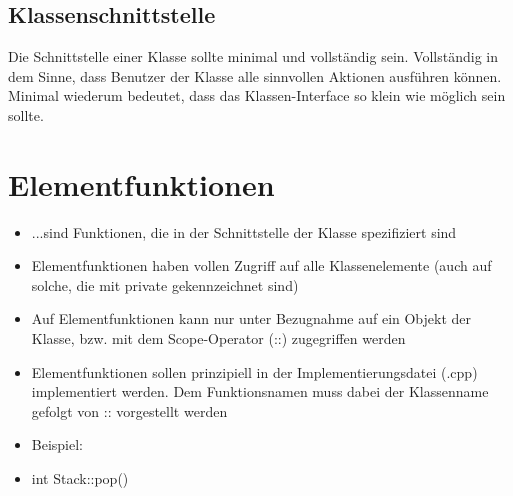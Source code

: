 \subsection{Klassenschnittstelle}
\label{sec:Klassenschnittstelle}
Die Schnittstelle einer Klasse sollte minimal und vollständig sein. Vollständig in dem Sinne, dass Benutzer der Klasse alle sinnvollen Aktionen ausführen können. Minimal wiederum bedeutet, dass das Klassen-Interface so klein wie möglich sein sollte.

\section{Elementfunktionen}
\label{sec:Elementfunktionen}
\begin{itemize}
	\item ...sind Funktionen, die in der Schnittstelle der Klasse spezifiziert sind
	\item Elementfunktionen haben vollen Zugriff auf alle Klassenelemente (auch auf solche, die mit private gekennzeichnet sind)
	\item Auf Elementfunktionen kann nur unter Bezugnahme auf ein Objekt der Klasse, bzw. mit dem Scope-Operator (::) zugegriffen werden
	\item Elementfunktionen sollen prinzipiell in der Implementierungsdatei (.cpp) implementiert werden. Dem Funktionsnamen muss dabei der Klassenname gefolgt von :: vorgestellt werden
	\item[\-] Beispiel:
	\item[\-] int Stack::pop()
\end{itemize}

